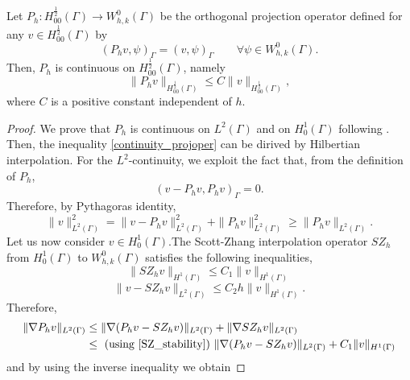 \begin{lemma}
Let $P_h: H^{\frac 12}_{00}(\Gamma) \longrightarrow W_{h,k}^0(\Gamma)$ be the orthogonal projection operator defined  for any $v \in H^{\frac 12}_{00}(\Gamma)$ by
\begin{equation*}
(P_h v , \psi)_\Gamma= (v, \psi)_\Gamma \qquad \forall \psi \in W_{h,k}^0(\Gamma).  
\end{equation*} 
Then, $P_h$ is continuous on $H^{\frac 12}_{00}(\Gamma)$, namely
\begin{equation}\label{continuity_projoper}
\|P_h v\|_{H^{\frac 12}_{00}(\Gamma)} \leq C \|v\|_{H^{\frac 12}_{00}(\Gamma)},
\end{equation}
where $C$ is a positive constant independent of $h$.
\end{lemma}
\begin{proof}
We prove that $P_h$ is continuous on $L^2(\Gamma)$ and on $H^1_0(\Gamma)$ following \cite[Section 1.6.3]{MR2050138}.  Then, the inequality \eqref{continuity_projoper} can be dirived by Hilbertian interpolation. For the $L^2$-continuity, we exploit the fact that, from the definition of $P_h$,
\begin{equation*}
(v-P_h v,P_h v)_{\Gamma}=0.
\end{equation*} 
Therefore, by Pythagoras identity,
\begin{equation*}
\|v\|^2_{L^2(\Gamma)} = \|v-P_h v\|_{L^2(\Gamma)}^2 + \|P_h v\|_{L^2(\Gamma)}^2 \geq \|P_h v\| _{L^2(\Gamma)}.
\end{equation*}
Let us now consider $v\in H^1_0(\Gamma)$.The Scott-Zhang interpolation operator $SZ_h$ from $H^1_0(\Gamma)$ to $W_{h,k}^0(\Gamma)$ satisfies the following inequalities,
\begin{equation}\label{SZ_stability}
\|SZ_h v\|_{H^1(\Gamma)} \leq C_1 \|v\|_{H^1(\Gamma)}
\end{equation} 
\begin{equation}\label{SZ_approx}
\|v -SZ_h v \|_{L^2(\Gamma)}\leq C_2 h \|v\|_{H^1(\Gamma)}.
\end{equation}
Therefore,
\begin{equation*}
\begin{split}
\|\nabla P_h v\|_{L^2(\Gamma)} 
&\leq \|\nabla (P_h v - SZ_h v)\|_{L^2(\Gamma)} + \|\nabla SZ_h v\|_{L^2(\Gamma)}\\
&\leq \text{ (using \eqref{SZ_stability}) } \|\nabla (P_h v - SZ_h v)\|_{L^2(\Gamma)} + C_1\|v\|_{H^1(\Gamma)}
\end{split}
\end{equation*}
and by using the inverse inequality we obtain

\end{proof}
